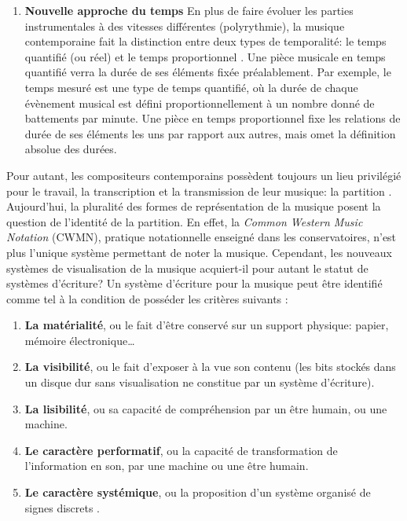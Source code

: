 \begin{enumerate}[label={(\arabic*)}]
	\item \textbf{Nouvelle approche du temps} En plus de faire évoluer les parties instrumentales à des vitesses différentes (polyrythmie), la musique contemporaine fait la distinction entre deux types de temporalité: le temps quantifié (ou réel) et le temps proportionnel \cite{honing1993}. Une pièce musicale en temps quantifié verra la durée de ses éléments fixée préalablement. Par exemple, le temps mesuré est une type de temps quantifié, où la durée de chaque évènement musical est défini proportionnellement à un nombre donné de battements par minute. Une pièce en temps proportionnel fixe les relations de durée de ses éléments les uns par rapport aux autres, mais omet la définition absolue des durées. 
\end{enumerate}

Pour autant, les compositeurs contemporains possèdent toujours un lieu privilégié pour le travail, la transcription et la transmission de leur musique: la partition \cite{bresson2008}.
Aujourd'hui, la pluralité des formes de représentation de la musique posent la question de l'identité de la partition. En effet, la \textit{Common Western Music Notation} (CWMN), pratique notationnelle enseigné dans les conservatoires, n'est plus l'unique système permettant de noter la musique. Cependant, les nouveaux systèmes de visualisation de la musique acquiert-il pour autant le statut de systèmes d'écriture? 
Un système d'écriture pour la musique peut être identifié comme tel à la condition de posséder les critères suivants \cite{veitl2007}:

\begin{enumerate}[label={(\arabic*)}]
	\item \textbf{La matérialité}, ou le fait d'être conservé sur un support physique: papier, mémoire électronique…	
	\item \textbf{La visibilité}, ou le fait d'exposer à la vue son contenu (les bits stockés dans un disque dur sans visualisation ne constitue par un système d'écriture).
	\item \textbf{La lisibilité}, ou sa capacité de compréhension par un être humain, ou une machine.
	\item \textbf{Le caractère performatif}, ou la capacité de transformation de l'information en son, par une machine ou une être humain.
	\item \textbf{Le caractère systémique}, ou la proposition d'un système organisé de \og signes discrets \fg.
\end{enumerate}

